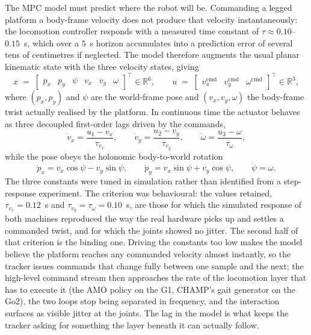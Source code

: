 \documentclass[11pt,a4paper]{article}
\newcommand{\R}{\mathbb{R}}
\begin{document}
The MPC model must predict where the robot will be. Commanding a legged platform
a body-frame velocity does not produce that velocity instantaneously: the locomotion controller responds with
a measured time constant of $\tau\approx0.10$--$0.15$~s, which over a $5$~s horizon accumulates into a
prediction error of several tens of centimetres if neglected. The model therefore augments the usual planar
kinematic state with the three velocity states, giving
\begin{equation}
  x \;=\; \begin{bmatrix} p_x & p_y & \psi & v_x & v_y & \omega\end{bmatrix}^{\!\top}\in\R^{6},
  \qquad
  u \;=\; \begin{bmatrix} v_x^{\mathrm{cmd}} & v_y^{\mathrm{cmd}} & \omega^{\mathrm{cmd}}\end{bmatrix}^{\!\top}\in\R^{3},
  \label{eq:state}
\end{equation}
where $(p_x,p_y)$ and $\psi$ are the world-frame pose and $(v_x,v_y,\omega)$ the body-frame twist actually
realised by the platform. In continuous time the actuator behaves as three decoupled first-order lags driven
by the commands,
\begin{equation}
  \dot v_x = \frac{u_1-v_x}{\tau_{v_x}},\qquad
  \dot v_y = \frac{u_2-v_y}{\tau_{v_y}},\qquad
  \dot \omega = \frac{u_3-\omega}{\tau_\omega},
  \label{eq:lagcont}
\end{equation}
while the pose obeys the holonomic body-to-world rotation
\begin{equation}
  \dot p_x = v_x\cos\psi - v_y\sin\psi,\qquad
  \dot p_y = v_x\sin\psi + v_y\cos\psi,\qquad
  \dot\psi = \omega .
  \label{eq:kincont}
\end{equation}
The three constants were tuned in simulation rather than identified from a step-response experiment. The
criterion was behavioural: the values retained, $\tau_{v_x}=0.12$~s and $\tau_{v_y}=\tau_\omega=0.10$~s, are
those for which the simulated response of both machines reproduced the way the real hardware picks up and
settles a commanded twist, and for which the joints showed no jitter. The second half of that criterion is
the binding one. Driving the constants too low makes the model believe the platform reaches any commanded
velocity almost instantly, so the tracker issues commands that change fully between one sample and the next;
the high-level command stream then approaches the rate of the locomotion layer that has to execute it (the
AMO policy on the G1, CHAMP's gait generator on the Go2), the two loops stop being separated in frequency,
and the interaction surfaces as visible jitter at the joints. The lag in the model is what keeps the tracker
asking for something the layer beneath it can actually follow.
\end{document}
